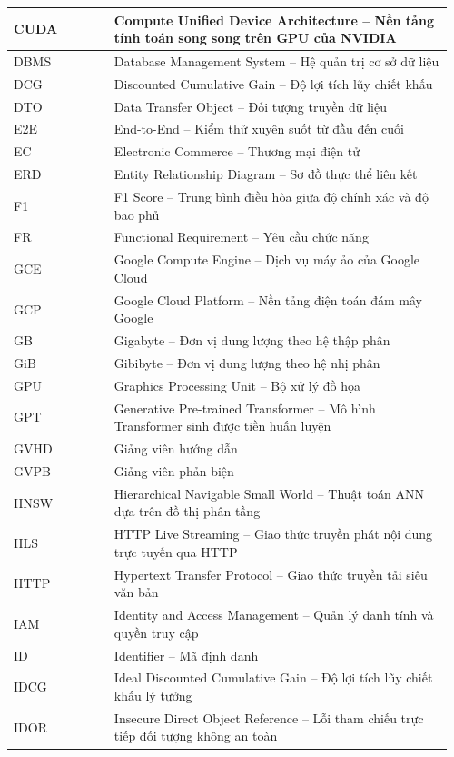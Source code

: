 \begin{longtable}{|p{0.22\linewidth}|p{0.74\linewidth}|}
CUDA & Compute Unified Device Architecture -- Nền tảng tính toán song song trên GPU của NVIDIA \\ \hline
DBMS & Database Management System -- Hệ quản trị cơ sở dữ liệu \\ \hline
DCG & Discounted Cumulative Gain -- Độ lợi tích lũy chiết khấu \\ \hline
DTO & Data Transfer Object -- Đối tượng truyền dữ liệu \\ \hline
E2E & End-to-End -- Kiểm thử xuyên suốt từ đầu đến cuối \\ \hline
EC & Electronic Commerce -- Thương mại điện tử \\ \hline
ERD & Entity Relationship Diagram -- Sơ đồ thực thể liên kết \\ \hline
F1 & F1 Score -- Trung bình điều hòa giữa độ chính xác và độ bao phủ \\ \hline
FR & Functional Requirement -- Yêu cầu chức năng \\ \hline
GCE & Google Compute Engine -- Dịch vụ máy ảo của Google Cloud \\ \hline
GCP & Google Cloud Platform -- Nền tảng điện toán đám mây Google \\ \hline
GB & Gigabyte -- Đơn vị dung lượng theo hệ thập phân \\ \hline
GiB & Gibibyte -- Đơn vị dung lượng theo hệ nhị phân \\ \hline
GPU & Graphics Processing Unit -- Bộ xử lý đồ họa \\ \hline
GPT & Generative Pre-trained Transformer -- Mô hình Transformer sinh được tiền huấn luyện \\ \hline
GVHD & Giảng viên hướng dẫn \\ \hline
GVPB & Giảng viên phản biện \\ \hline
HNSW & Hierarchical Navigable Small World -- Thuật toán ANN dựa trên đồ thị phân tầng \\ \hline
HLS & HTTP Live Streaming -- Giao thức truyền phát nội dung trực tuyến qua HTTP \\ \hline
HTTP & Hypertext Transfer Protocol -- Giao thức truyền tải siêu văn bản \\ \hline
IAM & Identity and Access Management -- Quản lý danh tính và quyền truy cập \\ \hline
ID & Identifier -- Mã định danh \\ \hline
IDCG & Ideal Discounted Cumulative Gain -- Độ lợi tích lũy chiết khấu lý tưởng \\ \hline
IDOR & Insecure Direct Object Reference -- Lỗi tham chiếu trực tiếp đối tượng không an toàn \\ \hline

\end{longtable}
